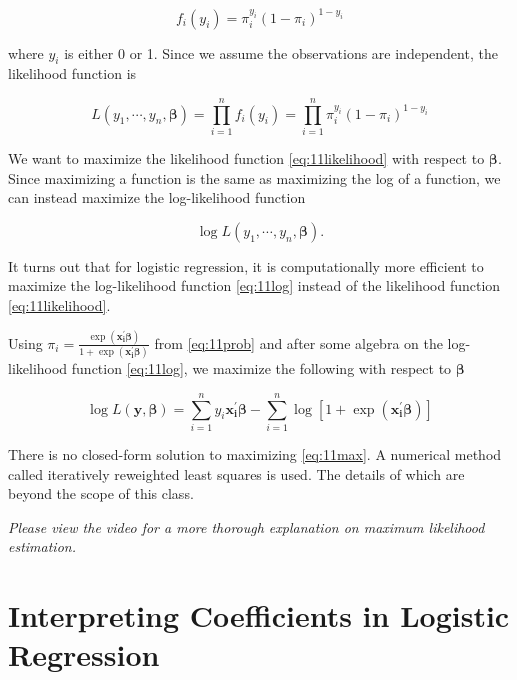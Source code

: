 \documentclass[
]{book}
\begin{document}
\begin{equation} 
f_i(y_i) = \pi_i^{y_i} (1 - \pi_i)^{1-y_i}
\label{eq:11dist}
\end{equation}

where \(y_i\) is either 0 or 1. Since we assume the observations are independent, the likelihood function is

\begin{equation} 
L(y_1, \cdots, y_n, \boldsymbol{\beta}) = \prod_{i=1}^n f_i(y_i) = \prod_{i=1}^n \pi_i^{y_i} (1 - \pi_i)^{1-y_i}
\label{eq:11likelihood}
\end{equation}

We want to maximize the likelihood function \eqref{eq:11likelihood} with respect to \(\boldsymbol{\beta}\). Since maximizing a function is the same as maximizing the log of a function, we can instead maximize the log-likelihood function

\begin{equation}
\log L(y_1, \cdots, y_n, \boldsymbol{\beta}).
\label{eq:11log}
\end{equation}

It turns out that for logistic regression, it is computationally more efficient to maximize the log-likelihood function \eqref{eq:11log} instead of the likelihood function \eqref{eq:11likelihood}.

Using \(\pi_i=\frac{\exp(\boldsymbol{x_i^{\prime}\beta})}{1 + \exp(\boldsymbol{x_i^{\prime}\beta})}\) from \eqref{eq:11prob} and after some algebra on the log-likelihood function \eqref{eq:11log}, we maximize the following with respect to \(\boldsymbol{\beta}\)

\begin{equation} 
\log L(\boldsymbol{y}, \boldsymbol{\beta}) = \sum_{i=1}^n y_i \boldsymbol{x_i^{\prime}\beta} - \sum_{i=1}^n \log [ 1 + \exp(\boldsymbol{x_i^{\prime}\beta}) ]
\label{eq:11max}
\end{equation}

There is no closed-form solution to maximizing \eqref{eq:11max}. A numerical method called iteratively reweighted least squares is used. The details of which are beyond the scope of this class.

\emph{Please view the video for a more thorough explanation on maximum likelihood estimation.}

\hypertarget{interpreting-coefficients-in-logistic-regression}{%
\section{Interpreting Coefficients in Logistic Regression}\label{interpreting-coefficients-in-logistic-regression}}
\end{document}
